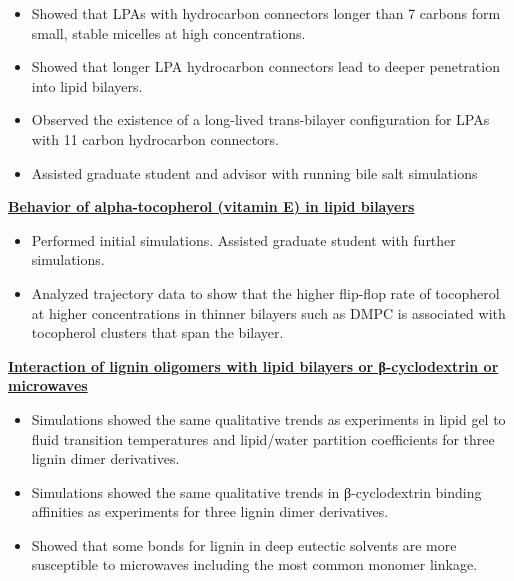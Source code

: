 \begin{cventries}
{\begin{cvitems}
                \vspace{2pt}
                \begin{itemize}
                \item {Showed that LPAs with hydrocarbon connectors longer than 7 carbons form small, stable micelles at high concentrations.}
                \item {Showed that longer LPA hydrocarbon connectors lead to deeper penetration into lipid bilayers.}
                \item {Observed the existence of a long-lived trans-bilayer configuration for LPAs with 11 carbon hydrocarbon connectors.}
                \item {Assisted graduate student and advisor with running bile salt simulations}
                \end{itemize}
            \item {\textbf{\underline{Behavior of alpha-tocopherol (vitamin E) in lipid bilayers}}}
                \vspace{2pt}
                \begin{itemize}
                \item {Performed initial simulations. Assisted graduate student with further simulations.}
                \item {Analyzed trajectory data to show that the higher flip-flop rate of tocopherol at higher concentrations in thinner bilayers such as DMPC is associated with tocopherol clusters that span the bilayer.}
                \end{itemize}
            \item {\textbf{\underline{Interaction of lignin oligomers with lipid bilayers or β-cyclodextrin or microwaves}}}
                \vspace{2pt}
                \begin{itemize}
                    \item {Simulations showed the same qualitative trends as experiments in lipid gel to fluid transition temperatures and lipid/water partition coefficients for three lignin dimer derivatives.}
                    \item {Simulations showed the same qualitative trends in β-cyclodextrin binding affinities as experiments for three lignin dimer derivatives.}
                    \item {Showed that some bonds for lignin in deep eutectic solvents are more susceptible to microwaves including the most common monomer linkage.}
                \end{itemize}            

\end{cvitems}}
\end{cventries}
